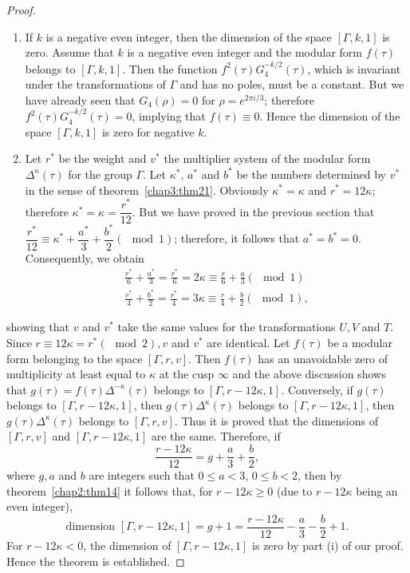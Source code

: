 \begin{proof}
\begin{enumerate}
\renewcommand{\theenumi}{\roman{enumi}}
\renewcommand{\labelenumi}{(\theenumi)}
\item If $k$ is a negative even integer, then the dimension of the
  space $[\Gamma, k,1]$ is zero. Assume that $k$ is a negative even
  integer and the modular form $f(\tau)$ belongs to $[\Gamma,
    k,1]$. Then the function $f^2(\tau)G^{-k/2}_4(\tau)$, which is
  invariant under the transformations of $\Gamma$ and has no poles,
  must be a constant. But we have already seen that $G_4(\rho)=0$ for
  $\rho=e^{2\pi i/3}$; therefore $f^2(\tau)G^{-k/2}_4(\tau)=0$,
  implying that $f(\tau)\equiv 0$. Hence the dimension of the space
  $[\Gamma, k, 1]$ is zero for negative $k$.

\item Let $r^{\ast}$ be the weight and $v^{\ast}$ the multiplier
  system of the modular form $\Delta^{\kappa}(\tau)$ for the group
  $\Gamma$. Let $\kappa^{\ast}$, $a^{\ast}$ and $b^{\ast}$ be the
  numbers determined by $v^{\ast}$ in the sense of 
theorem~\ref{chap3:thm21}. Obviously $\kappa^{\ast}=\kappa$ and $r^{\ast}=12\kappa$;
  therefore $\kappa^{\ast}=\kappa=\dfrac{r^{\ast}}{12}$. But we have
  proved in the previous section that $\dfrac{r^{\ast}}{12}\equiv
  \kappa^{\ast}+ \dfrac{a^{\ast}}{3}+\dfrac{b^{\ast}}{2}(\mod 1)$;
  therefore, it follows that $a^{\ast}=b^{\ast}=0$. Consequently, we
  obtain
\begin{align*}
\frac{r^{\ast}}{6}+\frac{a^{\ast}}{3} = \frac{r^{\ast}}{6} = 2\kappa
\equiv \frac{r}{6} + \frac{a}{3} (\mod 1)\\
\frac{r^{\ast}}{4} + \frac{b^{\ast}}{2} =\frac{r^{\ast}}{4} = 3\kappa
\equiv \frac{r}{4} + \frac{b}{2} (\mod 1),
\end{align*}
\end{enumerate}
showing that $v$ and $v^{\ast}$ take the same values for the
transformations $U,V$ and \pageoriginale $T$. Since $r\equiv
12\kappa=r^{\ast}(\mod 2),v$ and $v^{\ast}$ are identical. Let
$f(\tau)$ be a modular form belonging to the space $[\Gamma, r,
  v]$. Then $f(\tau)$ has an unavoidable zero of multiplicity at least
equal to $\kappa$ at the cusp $\infty$ and the above discussion shows
that $g(\tau)=f(\tau)\Delta^{-\kappa}(\tau)$ belongs to $[\Gamma,
  r-12\kappa, 1]$. Conversely, if $g(\tau)$ belongs to $[\Gamma,
  r-12\kappa, 1]$, then $g(\tau)\Delta^{\kappa}(\tau)$ belongs to
$[\Gamma, r-12\kappa, 1]$, then $g(\tau)\Delta^{\kappa}(\tau)$ belongs
to $[\Gamma, r, v]$. Thus it is proved that the dimensions of
$[\Gamma,r,v]$ and $[\Gamma,r-12\kappa,1]$ are the same. Therefore, if
$$
\frac{r-12\kappa}{12} = g+ \frac{a}{3} + \frac{b}{2}, 
$$
where $g,a$ and $b$ are integers such that $0\leq a < 3$, $0\leq b
<2$, then by theorem~\ref{chap2:thm14} it follows that, for $r-12\kappa \geq 0$ (due
to $r-12\kappa$ being an even integer),
$$
\text{dimension } [\Gamma,r-12\kappa,1] =g +1 =\frac{r-12\kappa}{12}
-\frac{a}{3} -\frac{b}{2} + 1. 
$$
For $r-12\kappa<0$, the dimension of $[\Gamma, r-12\kappa,1]$ is zero
by part (i) of our proof. Hence the theorem is established.


\end{proof}
